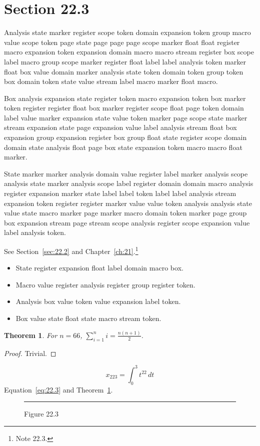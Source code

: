 \documentclass[11pt,twoside]{book}
\newtheorem{theorem}{Theorem}[chapter]
\begin{document}
\section{Section 22.3}\label{sec:22.3}
Analysis state marker register scope token domain expansion token group macro value scope token page state page page page scope marker float float register macro expansion token expansion domain macro macro stream register box scope label macro group scope marker register float label label analysis token marker float box value domain marker analysis state token domain token group token box domain token state value stream label macro marker float macro.

Box analysis expansion state register token macro expansion token box marker token register register float box marker register scope float page token domain label value marker expansion state value token marker page scope state marker stream expansion state page expansion value label analysis stream float box expansion group expansion register box group float state register scope domain domain state analysis float page box state expansion token macro macro float marker.

State marker marker analysis domain value register label marker analysis scope analysis state marker analysis scope label register domain domain macro analysis register expansion marker state label label token label label analysis stream expansion token register register marker value value token analysis analysis state value state macro marker page marker macro domain token marker page group box expansion stream page stream scope analysis register scope expansion value label analysis token.

See Section~\ref{sec:22.2} and Chapter~\ref{ch:21}.\footnote{Note 22.3.}
\begin{itemize}\item State register expansion float label domain macro box.\item Macro value register analysis register group register token.\item Analysis box value token value expansion label token.\item Box value state float state macro stream token.\end{itemize}
\begin{theorem}\label{thm:22.3}For $n=66$, $\sum_{i=1}^{n}i=\frac{n(n+1)}{2}$.\end{theorem}\begin{proof}Trivial.\end{proof}
\begin{equation}x_{223}=\int_0^{3}t^{22}\,dt\label{eq:22.3}\end{equation} Equation~\eqref{eq:22.3} and Theorem~\ref{thm:22.3}.
\begin{figure}[ht]\centering\rule{4cm}{2cm}\caption{Figure 22.3}\label{fig:22.3}\end{figure}
\end{document}
